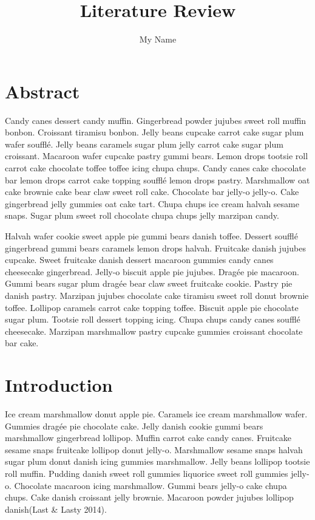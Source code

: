 \documentclass[12pt,]{article}
\title{Literature Review}
\author{My Name}
\date{}
\begin{document}
\maketitle

{
\setcounter{tocdepth}{3}
\tableofcontents
}
\section{Abstract}\label{abstract}

Candy canes dessert candy muffin. Gingerbread powder jujubes sweet roll
muffin bonbon. Croissant tiramisu bonbon. Jelly beans cupcake carrot
cake sugar plum wafer soufflé. Jelly beans caramels sugar plum jelly
carrot cake sugar plum croissant. Macaroon wafer cupcake pastry gummi
bears. Lemon drops tootsie roll carrot cake chocolate toffee toffee
icing chupa chups. Candy canes cake chocolate bar lemon drops carrot
cake topping soufflé lemon drops pastry. Marshmallow oat cake brownie
cake bear claw sweet roll cake. Chocolate bar jelly-o jelly-o. Cake
gingerbread jelly gummies oat cake tart. Chupa chups ice cream halvah
sesame snaps. Sugar plum sweet roll chocolate chupa chups jelly marzipan
candy.

Halvah wafer cookie sweet apple pie gummi bears danish toffee. Dessert
soufflé gingerbread gummi bears caramels lemon drops halvah. Fruitcake
danish jujubes cupcake. Sweet fruitcake danish dessert macaroon gummies
candy canes cheesecake gingerbread. Jelly-o biscuit apple pie jujubes.
Dragée pie macaroon. Gummi bears sugar plum dragée bear claw sweet
fruitcake cookie. Pastry pie danish pastry. Marzipan jujubes chocolate
cake tiramisu sweet roll donut brownie toffee. Lollipop caramels carrot
cake topping toffee. Biscuit apple pie chocolate sugar plum. Tootsie
roll dessert topping icing. Chupa chups candy canes soufflé cheesecake.
Marzipan marshmallow pastry cupcake gummies croissant chocolate bar
cake.

\section{Introduction}\label{introduction}

Ice cream marshmallow donut apple pie. Caramels ice cream marshmallow
wafer. Gummies dragée pie chocolate cake. Jelly danish cookie gummi
bears marshmallow gingerbread lollipop. Muffin carrot cake candy canes.
Fruitcake sesame snaps fruitcake lollipop donut jelly-o. Marshmallow
sesame snaps halvah sugar plum donut danish icing gummies marshmallow.
Jelly beans lollipop tootsie roll muffin. Pudding danish sweet roll
gummies liquorice sweet roll gummies jelly-o. Chocolate macaroon icing
marshmallow. Gummi bears jelly-o cake chupa chups. Cake danish croissant
jelly brownie. Macaroon powder jujubes lollipop danish(Last \& Lasty
2014).
\end{document}
